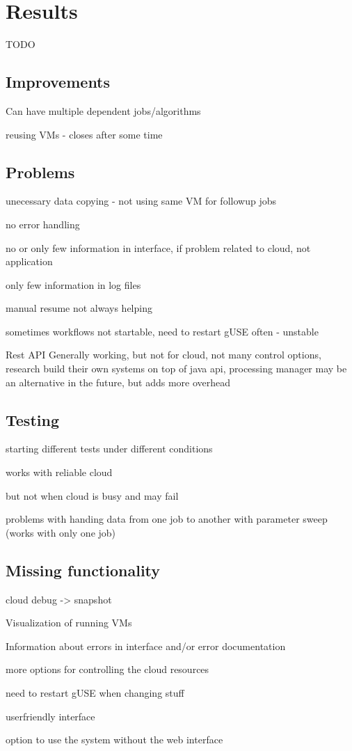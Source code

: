 \section{Results}\label{results}

TODO

\subsection{Improvements}\label{improvements}

Can have multiple dependent jobs/algorithms

reusing VMs - closes after some time

\subsection{Problems}\label{problems}

unecessary data copying - not using same VM for followup jobs

no error handling

no or only few information in interface, if problem related to cloud, not application

only few information in log files

manual resume not always helping

sometimes workflows not startable, need to restart gUSE often - unstable

Rest API Generally working, but not for cloud, not many control options, research build their own systems on top of java api, processing manager may be an alternative in the future, but adds more overhead

\subsection{Testing}\label{testing}

starting different tests under different conditions

works with reliable cloud

but not when cloud is busy and may fail

problems with handing data from one job to another with parameter sweep (works with only one job)

\subsection{Missing functionality}\label{missing}

cloud debug -> snapshot

Visualization of running VMs

Information about errors in interface and/or error documentation

more options for controlling the cloud resources

need to restart gUSE when changing stuff

userfriendly interface

option to use the system without the web interface